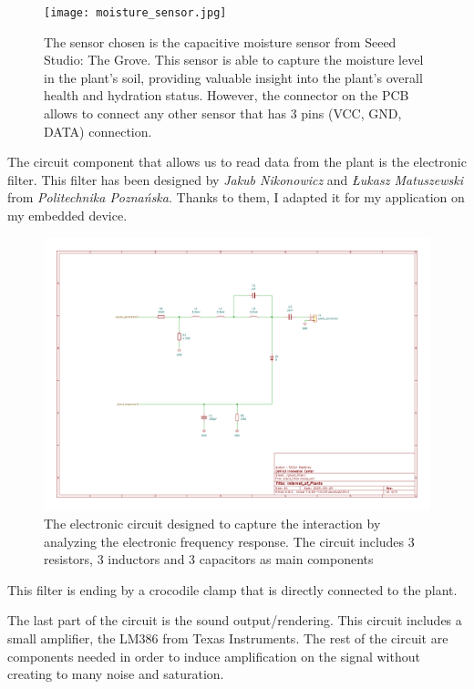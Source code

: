\begin{figure}[h]
    \centering
    \texttt{[image: moisture\_sensor.jpg]}
    \caption{The sensor chosen is the capacitive moisture sensor from Seeed Studio: The Grove. This sensor is able to capture the moisture level in the plant's soil, providing valuable insight into the plant's overall health and hydration status. However, the connector on the PCB allows to connect any other sensor that has 3 pins (VCC, GND, DATA) connection.}
    \vspace{0.1cm}
    \label{fig:moisture_sensor}
\end{figure}


The circuit component that allows us to read data from the plant is the electronic filter.
This filter has been designed by \textit{Jakub Nikonowicz} and \textit{Łukasz Matuszewski}
from \textit{Politechnika Poznańska}.
Thanks to them, I adapted it for my application on my embedded device.

\begin{figure}[H]
    \centering
    \includegraphics[width=\textwidth]{images/iop-plant_filter.pdf}
    \caption{The electronic circuit designed to capture the interaction by analyzing the electronic
        frequency response. The circuit includes 3 resistors, 3 inductors and 3 capacitors as main components}
    \vspace{0.1cm}
    \label{fig:iop_schematic_filter}
\end{figure}

This filter is ending by a crocodile clamp that is directly connected to the plant.

The last part of the circuit is the sound output/rendering. This circuit includes a small amplifier,
the LM386 from Texas Instruments. The rest of the circuit are components needed in order to
induce amplification on the signal without creating to many noise and saturation.


